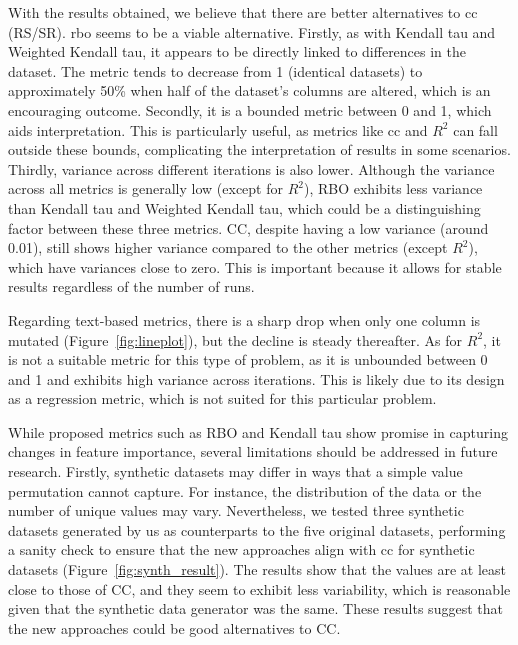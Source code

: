 

With the results obtained, we believe that there are better alternatives to \ac{cc} (RS/SR). \ac{rbo} seems to be a viable alternative. Firstly, as with Kendall tau and Weighted Kendall tau, it appears to be directly linked to differences in the dataset. The metric tends to decrease from 1 (identical datasets) to approximately 50\% when half of the dataset's columns are altered, which is an encouraging outcome. Secondly, it is a bounded metric between 0 and 1, which aids interpretation. This is particularly useful, as metrics like \ac{cc} and $R^2$ can fall outside these bounds, complicating the interpretation of results in some scenarios. Thirdly, variance across different iterations is also lower. Although the variance across all metrics is generally low (except for $R^2$), RBO exhibits less variance than Kendall tau and Weighted Kendall tau, which could be a distinguishing factor between these three metrics. CC, despite having a low variance (around 0.01), still shows higher variance compared to the other metrics (except $R^2$), which have variances close to zero. This is important because it allows for stable results regardless of the number of runs.

Regarding text-based metrics, there is a sharp drop when only one column is mutated (Figure~\ref{fig:lineplot}), but the decline is steady thereafter. As for $R^2$, it is not a suitable metric for this type of problem, as it is unbounded between 0 and 1 and exhibits high variance across iterations. This is likely due to its design as a regression metric, which is not suited for this particular problem.

While proposed metrics such as RBO and Kendall tau show promise in capturing changes in feature importance, several limitations should be addressed in future research. Firstly, synthetic datasets may differ in ways that a simple value permutation cannot capture. For instance, the distribution of the data or the number of unique values may vary. Nevertheless, we tested three synthetic datasets generated by us as counterparts to the five original datasets, performing a sanity check to ensure that the new approaches align with \ac{cc} for synthetic datasets (Figure~\ref{fig:synth_result}). The results show that the values are at least close to those of CC, and they seem to exhibit less variability, which is reasonable given that the synthetic data generator was the same. These results suggest that the new approaches could be good alternatives to CC.

